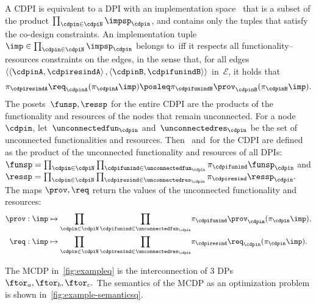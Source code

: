 A CDPI is equivalent to a DPI with an implementation space~\impsp
that is a subset of the product $\prod_{\cdpin\in\cdpiN}\impsp_{\cdpin}$,
and contains only the tuples that satisfy the co-design constraints.
An implementation tuple~$\imp\in\prod_{\cdpin\in\cdpiN}\impsp_{\cdpin}$
belongs to~\impsp iff it respects all functionality--resources
constraints on the edges, in the sense that, for all edges~$\left\langle \left\langle \cdpinA,\cdpiresindA\right\rangle ,\left\langle \cdpinB,\cdpifunindB\right\rangle \right\rangle $
in~$\mathcal{E}$, it holds that
\[
  \pi_{\cdpiresindA}\req_{\cdpinA}(\pi_{\cdpinA}\imp)\posleq\pi_{\cdpifunindB}\prov_{\cdpinB}(\pi_{\cdpinB}\imp).
\]
The posets~$\funsp,\ressp$ for the entire CDPI are the products
of the functionality and resources of the nodes that remain unconnected.
For a node~$\cdpin$, let~$\unconnectedfun_{\cdpin}$ and~$\unconnectedres_{\cdpin}$
be the set of unconnected functionalities and resources. Then~\funsp
and~\ressp for the CDPI are defined as the product of the unconnected
functionality and resources of all DPIs: $\funsp=\prod_{\cdpin\in\cdpiN}\prod_{\cdpifunind\in\unconnectedfun_{\cdpin}}\pi_{\cdpifunind}\funsp_{\cdpin}$
and $\ressp=\prod_{\cdpin\in\cdpiN}\prod_{\cdpiresind\in\unconnectedres_{\cdpin}}\pi_{\cdpiresind}\ressp_{\cdpin}.$
The maps $\prov,\req$ return the values of the unconnected functionality
and resources:
\begin{align*}
  \prov:\imp & \mapsto{\scriptstyle {\displaystyle \prod_{\cdpin\in\cdpiN}\prod_{\cdpifunind\in\unconnectedfun_{\cdpin}}}}\pi_{\cdpifunind}\prov_{\cdpin}(\pi_{\cdpin}\imp),\\
  \req:\imp & \mapsto{\displaystyle \prod_{\cdpin\in\cdpiN}\prod_{\cdpiresind\in\unconnectedres_{\cdpin}}}\pi_{\cdpiresind}\req_{\cdpin}(\pi_{\cdpin}\imp).
\end{align*}

\begin{example}
  The MCDP in~\cref{fig:exampleq} is the interconnection of 3
  DPs $\ftor_{a},\ftor_{b},\ftor_{c}.$ The semantics of the MCDP as
  an optimization problem is shown in~\cref{fig:example-semanticsq}.
\end{example}

\\



